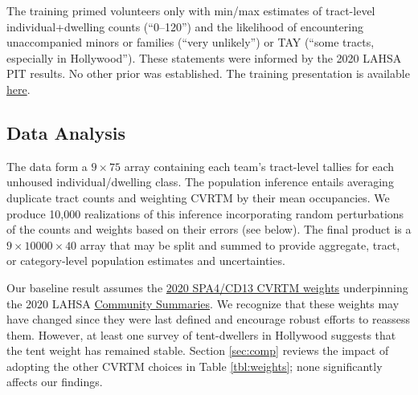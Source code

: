\documentclass[11pt,twocolumn]{article}
\def\ntracts{40}
\begin{document}
The training primed volunteers only with min/max estimates of tract-level individual+dwelling 
counts (``0--120'') and the likelihood of encountering unaccompanied minors or families (``very unlikely'')
or TAY (``some tracts, especially in Hollywood''). These statements were informed by the 2020 
LAHSA PIT results. No other prior was established. The training presentation is available 
\href{https://drive.google.com/file/d/1xFrtU26yjPuiUv9KHZ3Uj2_sAoT1ClGo/view?usp=sharing}{here}.

\subsection{Data Analysis}
\label{sec:analysis}

The data form a $9\times75$ array containing each team's tract-level tallies for each unhoused 
individual/dwelling class. The population inference entails averaging duplicate tract counts and 
weighting CVRTM by their mean occupancies. We produce 10,000 realizations of this inference 
incorporating random perturbations of the counts and weights based on their 
errors (see below). The final product is a $9\times10000\times\ntracts$ array that may be split and 
summed to provide aggregate, tract, or category-level population estimates and uncertainties.

Our baseline result assumes the 
\href{https://www.lahsa.org/documents?id=4635-usc-2018-2020-multipliers-and-estimates-overview.pdf}
{2020 SPA4/CD13 CVRTM weights} underpinning the 2020 LAHSA 
\href{https://www.lahsa.org/documents?id=4686-2020-greater-los-angeles-city-community-homelessness-report-service-planning-area-4.pdf}{Community Summaries}. We recognize that these weights may have changed since they were last
defined and encourage robust efforts to reassess them. However, at least one survey of tent-dwellers in Hollywood 
suggests that the tent weight has remained stable. Section \ref{sec:comp} reviews the impact of adopting
the other CVRTM choices in Table \ref{tbl:weights}; none significantly affects our findings.

\end{document}

